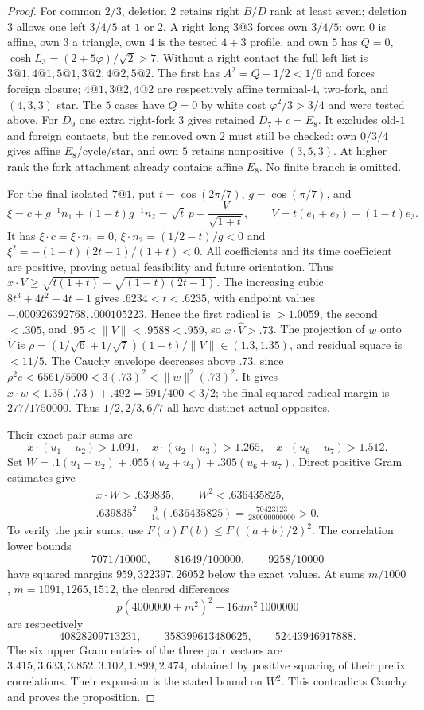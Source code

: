 \documentclass[11pt]{article}
\theoremstyle{remark}
\newcommand{\ph}{\varphi}
\begin{document}
\begin{proof}
For common $2/3$, deletion $2$ retains right $B/D$ rank at least
seven; deletion $3$ allows one left $3/4/5$ at $1$ or $2$.
A right long $3@3$ forces own $3/4/5$: own $0$ is affine, own $3$
a triangle, own $4$ is the tested $4+3$ profile, and own $5$ has
$Q=0$, $\cosh L_3=(2+5\ph)/\sqrt2>7$.
Without a right contact the full left list is
$3@1,4@1,5@1,3@2,4@2,5@2$.
The first has $A^2=Q-1/2<1/6$ and forces foreign closure;
$4@1,3@2,4@2$ are respectively affine terminal-$4$, two-fork,
and $(4,3,3)$ star. The $5$ cases have $Q=0$ by white cost
$\ph^2/3>3/4$ and were tested above.
For $D_9$ one extra right-fork $3$ gives retained $D_7+c=E_8$.
It excludes old-$1$ and foreign contacts, but the removed own $2$
must still be checked: own $0/3/4$ gives affine $E_8$/cycle/star,
and own $5$ retains nonpositive $(3,5,3)$. At higher rank the fork
attachment already contains affine $E_8$. No finite branch is omitted.

For the final isolated $7@1$, put $t=\cos(2\pi/7)$,
$g=\cos(\pi/7)$, and
\[
 \xi=c+g^{-1}n_1+(1-t)g^{-1}n_2
     =\sqrt t\,p-\frac V{\sqrt{1+t}},\qquad
 V=t(e_1+e_2)+(1-t)e_3.
\]
It has $\xi\cdot c=\xi\cdot n_1=0$,
$\xi\cdot n_2=(1/2-t)/g<0$ and
$\xi^2=-(1-t)(2t-1)/(1+t)<0$.
All coefficients and its time coefficient are positive, proving
actual feasibility and future orientation. Thus
$x\cdot V\ge\sqrt{t(1+t)}-\sqrt{(1-t)(2t-1)}$.
The increasing cubic $8t^3+4t^2-4t-1$ gives $.6234<t<.6235$,
with endpoint values $-.000926392768,.000105223$.
Hence the first radical is $>1.0059$, the second $<.305$,
and $.95<\|V\|<.9588<.959$, so $x\cdot\widehat V>.73$.
The projection of $w$ onto $\widehat V$ is
$\rho=(1/\sqrt6+1/\sqrt7)(1+t)/\|V\|\in(1.3,1.35)$,
and residual square is $<11/5$.
The Cauchy envelope decreases above $.73$, since
$\rho^2e<6561/5600<3(.73)^2<\|w\|^2(.73)^2$.
It gives $x\cdot w<1.35(.73)+.492=591/400<3/2$;
the final squared radical margin is $277/1750000$.
Thus $1/2,2/3,6/7$ all have distinct actual opposites.

Their exact pair sums are
\[
 x\cdot(u_1+u_2)>1.091,\quad
 x\cdot(u_2+u_3)>1.265,\quad
 x\cdot(u_6+u_7)>1.512.
\]
Set $W=.1(u_1+u_2)+.055(u_2+u_3)+.305(u_6+u_7)$. Direct positive
Gram estimates give
\[
\begin{gathered}
 x\cdot W>.639835,\qquad W^2<.636435825,\\
 .639835^2-\frac9{14}(.636435825)
 =\frac{70423123}{280000000000}>0.
\end{gathered}
\]
To verify the pair sums, use $F(a)F(b)\le F((a+b)/2)^2$.
The correlation lower bounds
\[
7071/10000,\qquad81649/100000,\qquad9258/10000
\]
have squared margins $959,\allowbreak322397,\allowbreak26052$ below the exact values.
At sums $m/1000$, $m=1091,\allowbreak1265,\allowbreak1512$, the cleared differences
\[
p(4000000+m^2)^2-16dm^2\,1000000
\]
are respectively
\[
40828209713231,\qquad358399613480625,\qquad52443946917888.
\]
The six upper Gram entries of the three pair vectors are
$3.415,3.633,3.852,3.102,1.899,2.474$, obtained by positive
squaring of their prefix correlations. Their expansion is the stated
bound on $W^2$. This contradicts Cauchy and proves the proposition.
\end{proof}
\end{document}
